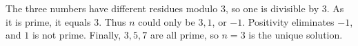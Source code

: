 The three numbers have different residues modulo $3$, so one is divisible by $3$. As it is prime, it equals $3$. Thus $n$ could only be $3,1$, or $-1$. Positivity eliminates $-1$, and $1$ is not prime. Finally, $3,5,7$ are all prime, so $\boxed{n=3}$ is the unique solution.
